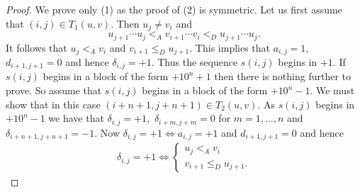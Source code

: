 \documentclass[10pt,a4paper]{amsart}
\begin{document}
\begin{proof} We prove only (1) as the proof of (2) is symmetric. Let us first assume that $(i,j)\in T_1(u,v).$ Then  $u_j\neq v_i$ and \begin{equation}\label{eq1}u_{j+1}\cdots u_j<_A v_{i+1}\cdots v_i <_D u_{j+1}\cdots u_j.\end{equation}
It follows that $u_j<_A v_i$ and $v_{i+1}\leq _D u_{j+1}.$ This implies that $a_{i,j}=1,$  $d_{i+1,j+1}=0 $ and hence $\delta_{i,j}=+1.$ Thus the  sequence $s(i,j)$ begins in $+1.$ If $s(i,j)$ begins in a block of the form $+10^n+1$ then there is nothing further to prove. So assume that $s(i,j)$ begins in a block of the form $+10^n-1.$ We must show that in this case $(i+n+1,j+n+1)\in T_2(u,v).$ As $s(i,j)$ begins in $+10^n-1$ we have that $\delta_{i,j}=+1,$ $\delta_{i+m,j+m}=0$ for $m=1,\ldots ,n$ and $\delta_{i+n+1,j+n+1}=-1.$  Now
$\delta_{i,j}=+1 \Leftrightarrow a_{i,j}=+1$ and $d_{i+1,j+1}=0$ and hence
\begin{align} \delta_{i,j}=+1 \Leftrightarrow \begin{cases}u_j<_A v_i\\v_{i+1}\leq_D u_{j+1}.\end{cases}\end{align}


\end{proof}
\end{document}
